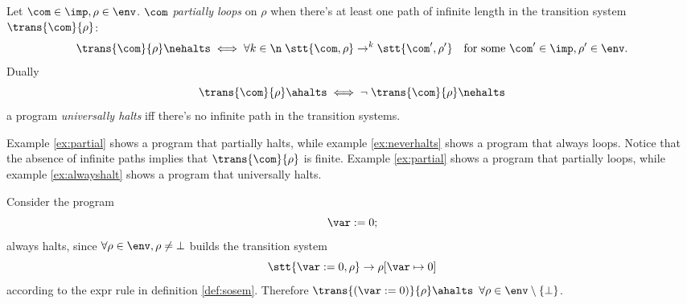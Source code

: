 \begin{definition}
  Let \(\com \in \imp, \rho \in \env\). \(\com\) \emph{partially
    loops} on \(\rho\) when there's at least one path of infinite
  length in the transition system \(\trans{\com}{\rho}\):
  \[ \trans{\com}{\rho} \nehalts \iff \forall k \in \n \; \stt{\com,
      \rho} \to^k \stt{\com', \rho'} \quad \text{for some }
    \com'\in\imp, \rho'\in\env.\] Dually
  \begin{equation*}
    \trans{\com}{\rho} \ahalts \iff \neg \; \trans{\com}{\rho}
    \nehalts
  \end{equation*}
  a program \emph{universally halts} iff there's no infinite path in
  the transition systems.
\end{definition}

Example \ref{ex:partial} shows a program that partially halts, while
example \ref{ex:neverhalts} shows a program that always loops.  Notice
that the absence of infinite paths implies that \(\trans{\com}{\rho}\)
is finite.  Example \ref{ex:partial} shows a program that partially
loops, while example \ref{ex:alwayshalt} shows a program that
universally halts.


\begin{example}\label{ex:alwayshalt}
  Consider the program
  \begin{equation*}
    \var := 0;
  \end{equation*}
  always halts, since \(\forall\rho \in \env, \rho \neq \bot\) builds
  the transition system \[\stt{\var := 0, \rho} \to \rho[\var \mapsto
    0]\] according to the expr rule in definition
  \ref{def:sosem}. Therefore \(\trans{(\var := 0)}{\rho} \ahalts\)
  \(\forall \rho \in \env\setminus\{\bot\}\).
\end{example}

